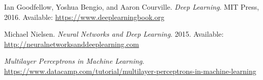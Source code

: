 \begin{thebibliography}{9}

Ian Goodfellow, Yoshua Bengio, and Aaron Courville. 
\textit{Deep Learning}. 
MIT Press, 2016. Available: \url{https://www.deeplearningbook.org}

Michael Nielsen. 
\textit{Neural Networks and Deep Learning}. 
2015. Available: \url{http://neuralnetworksanddeeplearning.com}

\textit{Multilayer Perceptrons in Machine Learning}.  \url{https://www.datacamp.com/tutorial/multilayer-perceptrons-in-machine-learning}

\end{thebibliography}
